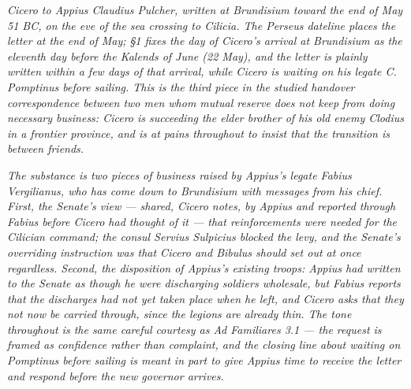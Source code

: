 
\textit{Cicero to Appius Claudius Pulcher, written at Brundisium
toward the end of May 51 BC, on the eve of the sea crossing to
Cilicia. The Perseus dateline places the letter at the end of
May; \S 1 fixes the day of Cicero's arrival at Brundisium as
the eleventh day before the Kalends of June (22 May), and the
letter is plainly written within a few days of that arrival,
while Cicero is waiting on his legate C. Pomptinus before
sailing. This is the third piece in the studied handover
correspondence between two men whom mutual reserve does not
keep from doing necessary business: Cicero is succeeding the
elder brother of his old enemy Clodius in a frontier province,
and is at pains throughout to insist that the transition is
between friends.}

\textit{The substance is two pieces of business raised by Appius's
legate Fabius Vergilianus, who has come down to Brundisium with
messages from his chief. First, the Senate's view --- shared,
Cicero notes, by Appius and reported through Fabius before
Cicero had thought of it --- that reinforcements were needed
for the Cilician command; the consul Servius Sulpicius blocked
the levy, and the Senate's overriding instruction was that
Cicero and Bibulus should set out at once regardless. Second,
the disposition of Appius's existing troops: Appius had written
to the Senate as though he were discharging soldiers wholesale,
but Fabius reports that the discharges had not yet taken place
when he left, and Cicero asks that they not now be carried
through, since the legions are already thin. The tone
throughout is the same careful courtesy as Ad Familiares 3.1
--- the request is framed as confidence rather than complaint,
and the closing line about waiting on Pomptinus before sailing
is meant in part to give Appius time to receive the letter and
respond before the new governor arrives.}
